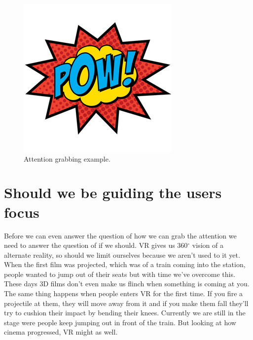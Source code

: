 \documentclass{report}
\begin{document}
				\begin{figure}[h!]
					\centering
					\includegraphics[width=\linewidth/3]{img/pow.jpg}
					\caption{Attention grabbing example.}
					\label{fig:pow}
				\end{figure}
				
				\section{Should we be guiding the users focus}
				Before we can even answer the question of how we can grab the attention we need to answer the question of if we should. VR gives us 360$^{\circ}$ vision of a alternate reality, so should we limit ourselves because we aren't used to it yet. When the first film was projected, which was of a train coming into the station, people wanted to jump out of their seats  but with time we've overcome this. These days 3D films don't even make us flinch when something is coming at you. The same thing happens when people enters VR for the first time. If you fire a projectile at them, they will move away from it and if you make them fall they'll try to cushion their impact by bending their knees. Currently we are still in the stage were people keep jumping out in front of the train. But looking at how cinema progressed, VR might as well. 
				
\end{document}
